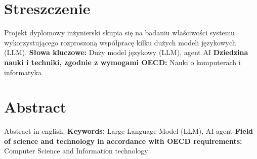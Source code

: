\chapter*{Streszczenie}
Projekt dyplomowy inżynierski skupia się na badaniu właściwości systemu wykorzystującego rozproszoną współpracę kilku dużych modeli językowych (LLM).
\newline
\newline
\textbf{Słowa kluczowe:} 
Duży model językowy (LLM), agent AI
\newline
\textbf{Dziedzina nauki i techniki, zgodnie z wymogami OECD: }
\newline
Nauki o komputerach i informatyka


\chapter*{Abstract}
Abstract in english.
\newline
\newline
\textbf{Keywords:}
Large Language Model (LLM), AI agent
\newline
\textbf{Field of science and technology in accordance with OECD requirements: } \newline
Computer Science and Information technology